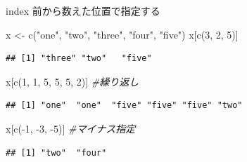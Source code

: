 \documentclass[
  ignorenonframetext,
]{beamer}
\newenvironment{Shaded}{\begin{snugshade}}{\end{snugshade}}
\newcommand{\CommentTok}[1]{\textcolor[rgb]{0.56,0.35,0.01}{\textit{#1}}}
\newcommand{\DecValTok}[1]{\textcolor[rgb]{0.00,0.00,0.81}{#1}}
\newcommand{\FunctionTok}[1]{\textcolor[rgb]{0.00,0.00,0.00}{#1}}
\newcommand{\NormalTok}[1]{#1}
\newcommand{\OtherTok}[1]{\textcolor[rgb]{0.56,0.35,0.01}{#1}}
\newcommand{\SpecialCharTok}[1]{\textcolor[rgb]{0.00,0.00,0.00}{#1}}
\newcommand{\StringTok}[1]{\textcolor[rgb]{0.31,0.60,0.02}{#1}}
\begin{document}
\begin{frame}[fragile]{index}
\protect\hypertarget{index}{}
前から数えた位置で指定する

\begin{Shaded}
\begin{Highlighting}[]
\NormalTok{x }\OtherTok{\textless{}{-}} \FunctionTok{c}\NormalTok{(}\StringTok{"one"}\NormalTok{, }\StringTok{"two"}\NormalTok{, }\StringTok{"three"}\NormalTok{, }\StringTok{"four"}\NormalTok{, }\StringTok{"five"}\NormalTok{)}
\NormalTok{x[}\FunctionTok{c}\NormalTok{(}\DecValTok{3}\NormalTok{, }\DecValTok{2}\NormalTok{, }\DecValTok{5}\NormalTok{)] }
\end{Highlighting}
\end{Shaded}

\begin{verbatim}
## [1] "three" "two"   "five"
\end{verbatim}

\begin{Shaded}
\begin{Highlighting}[]
\NormalTok{x[}\FunctionTok{c}\NormalTok{(}\DecValTok{1}\NormalTok{, }\DecValTok{1}\NormalTok{, }\DecValTok{5}\NormalTok{, }\DecValTok{5}\NormalTok{, }\DecValTok{5}\NormalTok{, }\DecValTok{2}\NormalTok{)] }\CommentTok{\#繰り返し}
\end{Highlighting}
\end{Shaded}

\begin{verbatim}
## [1] "one"  "one"  "five" "five" "five" "two"
\end{verbatim}

\begin{Shaded}
\begin{Highlighting}[]
\NormalTok{x[}\FunctionTok{c}\NormalTok{(}\SpecialCharTok{{-}}\DecValTok{1}\NormalTok{, }\SpecialCharTok{{-}}\DecValTok{3}\NormalTok{, }\SpecialCharTok{{-}}\DecValTok{5}\NormalTok{)] }\CommentTok{\#マイナス指定}
\end{Highlighting}
\end{Shaded}

\begin{verbatim}
## [1] "two"  "four"
\end{verbatim}
\end{frame}
\end{document}
